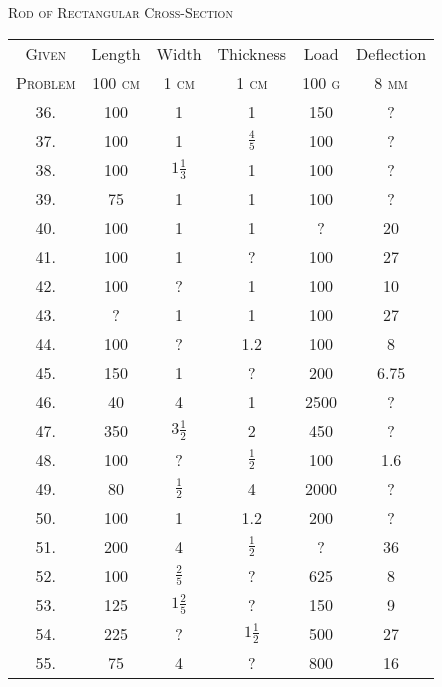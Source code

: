 \begin{center}
 \textsc{Rod of Rectangular Cross-Section}

\begin{table}[h!]
    \begin{center}
    \bgroup
    \def\arraystretch{1.2}%
        \begin{tabular}{c|c|c|c|c|c}
            \hline
            \hline
            \textsc{Given} & Length & Width & Thickness & Load & Deflection \\
            \cline{2-6}
            \textsc{Problem} & 100 \textsc{cm} & 1 \textsc{cm} & 1 \textsc{cm} & 100 \textsc{g} & 8 \textsc{mm} \\
            \hline
            36. & 100 & 1 & 1 & 150 & ? \\
            37. & 100 & 1 & $\frac{4}{5}$ & 100 & ? \\
            38. & 100 & $1\frac{1}{3}$ & 1 & 100 & ? \\
            39. & 75 & 1 & 1 & 100 & ? \\
            40. & 100 & 1 & 1 & ? & 20 \\
            41. & 100 & 1 & ? & 100 & 27 \\
            42. & 100 & ? & 1 & 100 & 10 \\
            43. & ? & 1 & 1 & 100 & 27 \\
            44. & 100 & ? & 1.2 & 100 & 8 \\
            45. & 150 & 1 & ? & 200 & 6.75 \\
            46. & 40 & 4 & 1 & 2500 & ? \\
            47. & 350 & $3\frac{1}{2}$ & 2 & 450 & ? \\
            48. & 100 & ? & $\frac{1}{2}$ & 100 & 1.6 \\
            49. & 80 & $\frac{1}{2}$ & 4 & 2000 & ? \\
            50. & 100 & 1 & 1.2 & 200 & ? \\
            51. & 200 & 4 & $\frac{1}{2}$ & ? & 36 \\
            52. & 100 & $\frac{2}{5}$ & ? & 625 & 8 \\
            53. & 125 & $1\frac{2}{5}$ & ? & 150 & 9 \\
            54. & 225 & ? & $1\frac{1}{2}$ & 500 & 27 \\
            55. & 75 & 4 & ? & 800 & 16 \\
            \hline
            \hline
        \end{tabular}
    \egroup
    \end{center}

\end{table}

\end{center}
